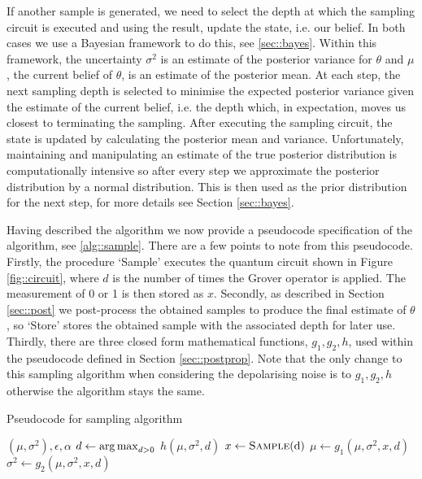 If another sample is generated, we need to select the depth at which the sampling circuit is executed and using the result, update the state, i.e. our belief. In both cases we use a Bayesian framework to do this, see \ref{sec::bayes}. Within this framework, the uncertainty $\sigma^2$ is an estimate of the posterior variance for $\theta$ and $\mu$, the current belief of $\theta$, is an estimate of the posterior mean. At each step, the next sampling depth is selected to minimise the expected posterior variance given the estimate of the current belief, i.e. the depth which, in expectation, moves us closest to terminating the sampling. After executing the sampling circuit, the state is updated by calculating the posterior mean and variance. Unfortunately, maintaining and manipulating an estimate of the true posterior distribution is computationally intensive so after every step we approximate the posterior distribution by a normal distribution. This is then used as the prior distribution for the next step, for more details see Section \ref{sec::bayes}.

Having described the algorithm we now provide a pseudocode specification of the algorithm, see \ref{alg::sample}. There are a few points to note from this pseudocode. Firstly, the procedure `Sample' executes the quantum circuit shown in Figure \ref{fig::circuit}, where $d$ is the number of times the Grover operator is applied. The measurement of 0 or 1 is then stored as $x$. Secondly, as described in Section \ref{sec::post} we post-process the obtained samples to produce the final estimate of $\theta$, so `Store' stores the obtained sample with the associated depth for later use. Thirdly, there are three closed form mathematical functions, $g_1,g_2,h$, used within the pseudocode defined in Section \ref{sec::postprop}. Note that the only change to this sampling algorithm when considering the depolarising noise is to $g_1,g_2,h$ otherwise the algorithm stays the same.

\begin{algorithm}
	\caption{Pseudocode for sampling algorithm }\label{alg::sample}
	\begin{algorithmic}
		\Require $(\mu, \sigma^2), \epsilon, \alpha$
		 
		\State $d \gets \operatorname*{arg\,max}_{d>0} $ $ h(\mu,\sigma^2,d)$ 
		\State $x\gets \Call{Sample}{$d$}$
		\State $\mu \gets g_1(\mu,\sigma^2,x,d)$
		\State $\sigma^2 \gets g_2(\mu,\sigma^2,x,d)$ 
		\State {} 
		\EndWhile
	\end{algorithmic}
\end{algorithm}
